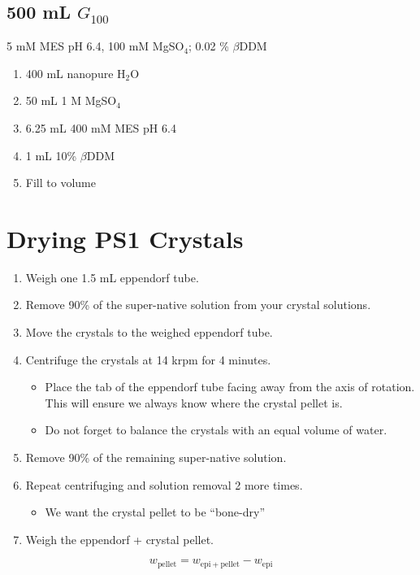 \documentclass[12pt]{article}
\begin{document}
    \subsection{500 mL $G_{100}$}
    5 mM MES pH 6.4, 100 mM MgSO$_{4}$; 0.02 \% $\beta$DDM
    \begin{enumerate}
        \item 400 mL nanopure H$_{2}$O
        \item 50 mL 1 M MgSO$_{4}$
        \item 6.25 mL 400 mM MES pH 6.4
        \item 1 mL 10\% $\beta$DDM
        \item Fill to volume
    \end{enumerate}

    \newpage

    \section{Drying PS1 Crystals}
    \begin{enumerate}
        \item Weigh one 1.5 mL eppendorf tube.
        \item Remove 90\% of the super-native solution from your crystal solutions.
        \item Move the crystals to the weighed eppendorf tube.
        \item Centrifuge the crystals at 14 krpm for 4 minutes.
        \begin{itemize}
            \item Place the tab of the eppendorf tube facing away from the axis of rotation. This will ensure we always know where the crystal pellet is.
            \item Do not forget to balance the crystals with an equal volume of water.
        \end{itemize}
        \item Remove 90\% of the remaining super-native solution.
        \item Repeat centrifuging and solution removal 2 more times.
        \begin{itemize}
            \item We want the crystal pellet to be ``bone-dry''
        \end{itemize}
        \item Weigh the eppendorf + crystal pellet.
    \end{enumerate}
    \begin{equation}
        w_{\mathrm{pellet}} = w_{\mathrm{epi + pellet}} - w_{\mathrm{epi}}
    \end{equation}
\end{document}
